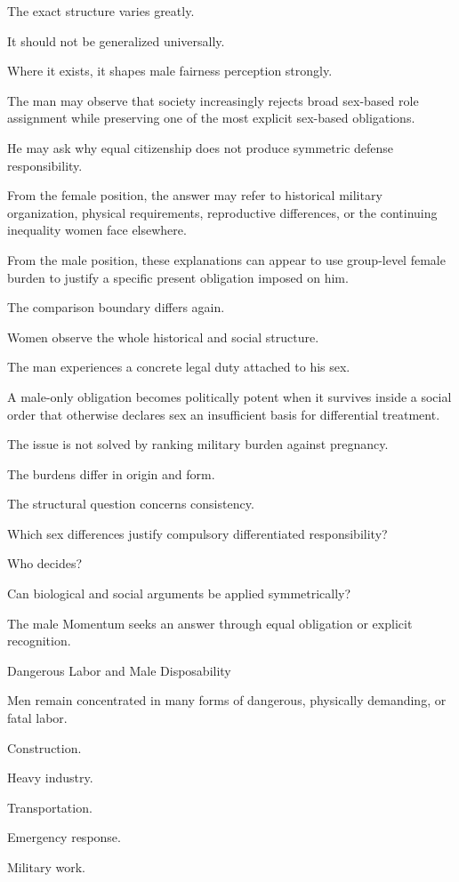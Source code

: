 The exact structure varies greatly.

It should not be generalized universally.

Where it exists, it shapes male fairness perception strongly.

The man may observe that society increasingly rejects broad sex-based role assignment while preserving one of the most explicit sex-based obligations.

He may ask why equal citizenship does not produce symmetric defense responsibility.

From the female position, the answer may refer to historical military organization, physical requirements, reproductive differences, or the continuing inequality women face elsewhere.

From the male position, these explanations can appear to use group-level female burden to justify a specific present obligation imposed on him.

The comparison boundary differs again.

Women observe the whole historical and social structure.

The man experiences a concrete legal duty attached to his sex.

A male-only obligation becomes politically potent when it survives inside a social order that otherwise declares sex an insufficient basis for differential treatment.

The issue is not solved by ranking military burden against pregnancy.

The burdens differ in origin and form.

The structural question concerns consistency.

Which sex differences justify compulsory differentiated responsibility?

Who decides?

Can biological and social arguments be applied symmetrically?

The male Momentum seeks an answer through equal obligation or explicit recognition.

Dangerous Labor and Male Disposability

Men remain concentrated in many forms of dangerous, physically demanding, or fatal labor.

Construction.

Heavy industry.

Transportation.

Emergency response.

Military work.

